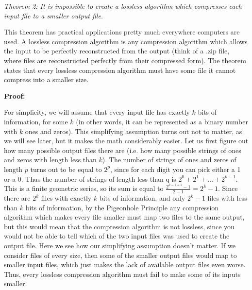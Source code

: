 \textit{Theorem 2: It is impossible to create a lossless algorithm
which compresses each input file to a smaller output file.} 

This theorem has practical applications pretty much everywhere computers are used. A lossless
compression algorithm is any compression algorithm which allows the input to be
perfectly reconstructed from the output (think of a .zip file, where
files are reconstructed perfectly from their compressed form). The theorem states that every
lossless compression algorithm must have some file  it cannot compress into a smaller size.

\noindent
\textbf{Proof:}

For simplicity, we will assume that every input file has
exactly $k$ bits of information, for some $k$ (in other words, it can be
represented as a binary number with $k$ ones and zeros). This simplifying
assumption turns out not to matter, as we will see later, but it makes the math
considerably easier. Let us first figure out how many possible output files
there are (i.e. how many possible strings of ones and zeros with length less
than $k$). The number of strings of ones and zeros of length $p$ turns out to
be equal to $2^p$, since for each digit you can pick either a 1 or a 0. Thus the
number of strings of length less than q is $2^0 + 2^1 + \ldots + 2^{k - 1}$.
This is a finite geometric series, so its sum is equal to $\frac{2^{k - 1 + 1}
- 1}{2 - 1} = 2^k - 1$. Since there are $2^k$ files with exactly $k$ bits of
information, and only $2^k - 1$ files with less than $k$ bits of information,
by the Pigeonhole Principle any compression algorithm which makes every file
smaller must map two files to the same output, but this would mean that the
compression algorithm is not lossless, since you would not be able to tell
which of the two input files was used to create the output file. Here we see
how our simplifying assumption doesn't matter. If we consider files of every
size, then some of the smaller output files would map to smaller input files,
which just makes the lack of available output files even worse. Thus, every
lossless compression algorithm must fail to make some of its inputs smaller.